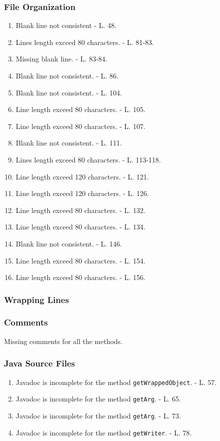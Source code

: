 \subsubsection{File Organization}

\begin{enumerate}
	\item Blank line not consistent - L. 48.
	\item Lines length exceed 80 characters. - L. 81-83.
	\item Missing blank line. - L. 83-84.
	\item Blank line not consistent. - L. 86.
	\item Blank line not consistent. - L. 104.
	\item Line length exceed 80 characters. - L. 105.
	\item Line length exceed 80 characters. - L. 107.
	\item Blank line not consistent. - L. 111.
	\item Lines length exceed 80 characters. - L. 113-118.
	\item Line length exceed 120 characters. - L. 121.
	\item Line length exceed 120 characters. - L. 126.
	\item Line length exceed 80 characters. - L. 132.
	\item Line length exceed 80 characters. - L. 134.
	\item Blank line not consistent. - L. 146.
	\item Line length exceed 80 characters. - L. 154.
	\item Line length exceed 80 characters. - L. 156.
\end{enumerate}

\subsubsection{Wrapping Lines}

\subsubsection{Comments}

Missing comments for all the methods.

\subsubsection{Java Source Files}

\begin{enumerate}
	\item Javadoc is incomplete for the method \texttt{getWrappedObject}. - L. 57.
	\item Javadoc is incomplete for the method \texttt{getArg}. - L. 65.
	\item Javadoc is incomplete for the method \texttt{getArg}. - L. 73.
	\item Javadoc is incomplete for the method \texttt{getWriter}. - L. 78.
\end{enumerate}

